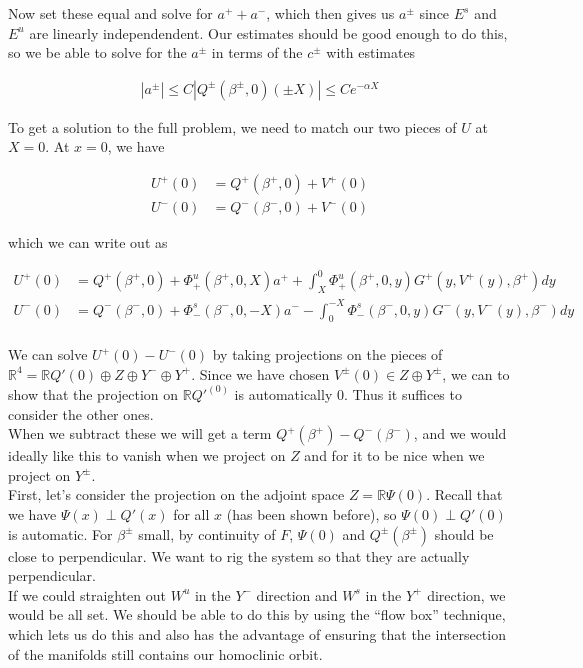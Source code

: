 \documentclass[12pt]{article}
\def\R{{\mathbb R}}
\begin{document}
Now set these equal and solve for $a^+ + a^-$, which then gives us $a^\pm$ since $E^s$ and $E^u$ are linearly independendent. Our estimates should be good enough to do this, so we be able to solve for the $a^\pm$ in terms of the $c^\pm$ with estimates

\begin{align*}
|a^\pm| \leq C |Q^\pm(\beta^\pm, 0)(\pm X)| \leq C e^{-\alpha X}
\end{align*}

To get a solution to the full problem, we need to match our two pieces of $U$ at $X = 0$. At $x = 0$, we have

\begin{align*}
U^+(0) &= Q^+(\beta^+, 0) + V^+(0) \\
U^-(0) &= Q^-(\beta^-, 0) + V^-(0)
\end{align*}

which we can write out as

\begin{align*}
U^+(0) &= Q^+(\beta^+, 0) + \Phi^u_+(\beta^+, 0, X) a^+ + \int_{X}^0 \Phi_+^u(\beta^+, 0, y) G^+(y, V^+(y),\beta^+)dy \\
U^-(0) &= Q^-(\beta^-, 0) + \Phi^s_-(\beta^-, 0, -X) a^- - \int_0^{-X} \Phi_-^s(\beta^-, 0, y) G^-(y, V^-(y),\beta^-)dy \\
\end{align*}

We can solve $U^+(0) - U^-(0)$ by taking projections on the pieces of $\R^4 = \R Q'(0) \oplus Z \oplus Y^- \oplus Y^+$. Since we have chosen $V^\pm(0) \in Z \oplus Y^\pm$, we can to show that the projection on $\R Q'^(0)$ is automatically 0. Thus it suffices to consider the other ones.\\

When we subtract these we will get a term $Q^+(\beta^+) - Q^-(\beta^-)$, and we would ideally like this to vanish when we project on $Z$ and for it to be nice when we project on $Y^\pm$. \\

First, let's consider the projection on the adjoint space $Z = \R \Psi(0)$. Recall that we have $\Psi(x) \perp Q'(x)$ for all $x$ (has been shown before), so 
$\Psi(0) \perp Q'(0)$ is automatic. For $\beta^\pm$ small, by continuity of $F$, $\Psi(0)$ and $Q^\pm(\beta^\pm)$ should be close to perpendicular. We want to rig the system so that they are actually perpendicular. \\

If we could straighten out $W^u$ in the $Y^-$ direction and $W^s$ in the $Y^+$ direction, we would be all set. We should be able to do this by using the ``flow box'' technique, which lets us do this and also has the advantage of ensuring that the intersection of the manifolds still contains our homoclinic orbit.\\
\end{document}

